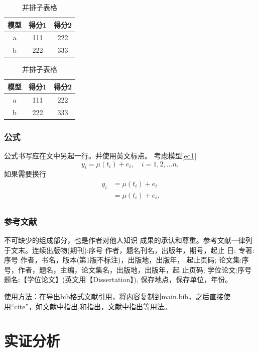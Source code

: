 \documentclass{THUThesis}
\begin{document}
\begin{table}[htbp]
\centering
\caption{并排子表格}
\label{tab:subtable}
{
\begin{tabular}{c|c|c}
\hline
模型 & 得分1 &得分2 \\
\hline
a &111 & 222 \\
b &222 & 333 \\
\hline
\end{tabular}
}
\hskip2cm
{
\begin{tabular}{c|c|c}
\hline
模型 & 得分1 &得分2 \\
\hline
a &111 & 222 \\
b &222 & 333 \\
\hline
\end{tabular}
}
\end{table}


\subsubsection{公式}
公式书写应在文中另起一行。并使用英文标点。
考虑模型\eqref{eq1}
\begin{equation}
y_i = \mu(t_i) + e_i, \quad i = 1,2,\dots n,
\label{eq1}
\end{equation}
如果需要换行
\begin{equation}
  \begin{aligned}
  y_i &= \mu(t_i) + e_i\\
      &= \mu(t_i) + e_i.\\
  \end{aligned}
\end{equation}

\subsubsection{参考文献}
不可缺少的组成部分，也是作者对他人知识
成果的承认和尊重。参考文献一律列于文末。连续出版物(期刊):序号 作者，题名刊名，出版年，期号，起止 日;
专著:序号 作者，书名，版本(第1版不标注)，出版地，出版年， 起止页码; 论文集:序号，作者，题名，主编，论文集名，出版地，出版年，起 止页码;
学位论文:序号 题名;【学位论文】(英文用【Dissertation】),
保存地点，保存单位，年份。\par
使用方法：在导出bib格式文献引用，将内容复制到main.bib，之后直接使用“cite”，如文献中指出\cite{guegan2005can},\citet{guegan2005can}和\citet{dahlhaus1997}指出，文献中指出\cite{guegan2005can,dahlhaus1997}等用法。


\section{实证分析}
\end{document}

